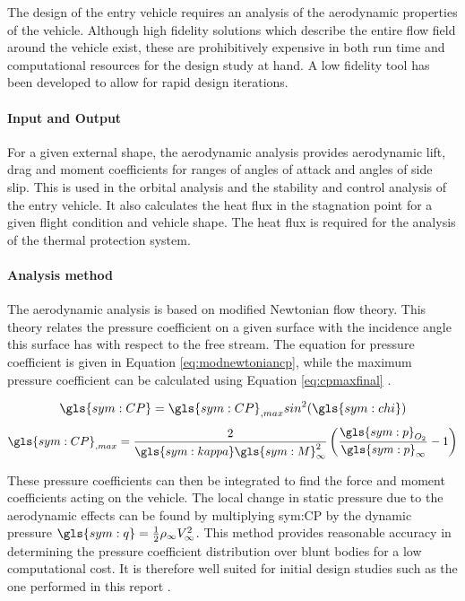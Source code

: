 The design of the entry vehicle requires an analysis of the aerodynamic properties of the vehicle. Although high fidelity solutions which describe the entire flow field around the vehicle exist, these are prohibitively expensive in both run time and computational resources for the design study at hand. A low fidelity tool has been developed to allow for rapid design iterations. 

\paragraph{Input and Output}
For a given external shape, the aerodynamic analysis provides aerodynamic lift, drag and moment coefficients for ranges of angles of attack and angles of side slip. This is used in the orbital analysis and the stability and control analysis of the entry vehicle. It also calculates the heat flux in the stagnation point for a given flight condition and vehicle shape. The heat flux is required for the analysis of the thermal protection system. 

\paragraph{Analysis method}
The aerodynamic analysis is based on modified Newtonian flow theory. This theory relates the pressure coefficient on a given surface with the incidence angle this surface has with respect to the free stream. The equation for pressure coefficient is given in Equation \ref{eq:modnewtoniancp}, while the maximum pressure coefficient can be calculated using Equation \ref{eq:cpmaxfinal} \cite{AndersonJr.2006}.

\begin{multicols}{2}
	\begin{equation}
		\gls{sym:CP}=\gls{sym:CP}_{,max}sin^{2}(\gls{sym:chi})
		\label{eq:modnewtoniancp}
	\end{equation} \break
	\begin{equation}
		\gls{sym:CP}_{,max} = \frac{2}{\gls{sym:kappa} \gls{sym:M}_{\infty}^{2}}\left(\frac{\gls{sym:p}_{O_{2}}}{\gls{sym:p}_{\infty}}-1\right)
		\label{eq:cpmaxfinal}
	\end{equation}
\end{multicols}

These pressure coefficients can then be integrated to find the force and moment coefficients acting on the vehicle. The local change in static pressure due to the aerodynamic effects can be found by multiplying \gls{sym:CP} by the dynamic pressure $\gls{sym:q}=\frac{1}{2}\rho_{\infty}V_{\infty}^{2}$. This method provides reasonable accuracy in determining the pressure coefficient distribution over blunt bodies for a low computational cost. It is therefore well suited for initial design studies such as the one performed in this report \cite{AndersonJr.2006}.

